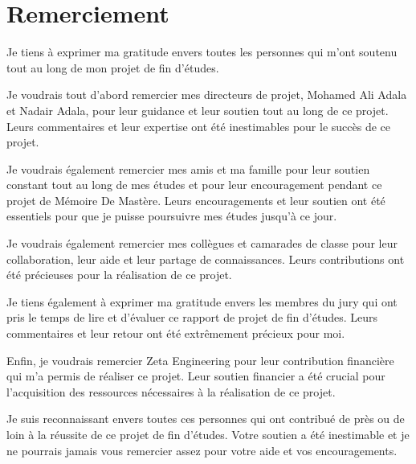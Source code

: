 \chapter*{Remerciement }

\setlength{\parskip}{5mm}
\setlength{\parindent}{1cm}


\large{
Je tiens à exprimer ma gratitude envers toutes les personnes qui m'ont soutenu tout au long de mon projet de fin d'études.


Je voudrais tout d'abord remercier mes directeurs de projet, Mohamed Ali Adala et Nadair Adala, pour leur guidance et leur soutien tout au long de ce projet. Leurs commentaires et leur expertise ont été inestimables pour le succès de ce projet.


Je voudrais également remercier mes amis et ma famille pour leur soutien constant tout au long de mes études et pour leur encouragement pendant ce projet de Mémoire De Mastère. Leurs encouragements et leur soutien ont été essentiels pour que je puisse poursuivre mes études jusqu'à ce jour.


Je voudrais également remercier mes collègues et camarades de classe pour leur collaboration, leur aide et leur partage de connaissances. Leurs contributions ont été précieuses pour la réalisation de ce projet.


Je tiens également à exprimer ma gratitude envers les membres du jury qui ont pris le temps de lire et d'évaluer ce rapport de projet de fin d'études. Leurs commentaires et leur retour ont été extrêmement précieux pour moi.


Enfin, je voudrais remercier Zeta Engineering pour leur contribution financière qui m'a permis de réaliser ce projet. Leur soutien financier a été crucial pour l'acquisition des ressources nécessaires à la réalisation de ce projet.


Je suis reconnaissant envers toutes ces personnes qui ont contribué de près ou de loin à la réussite de ce projet de fin d'études. Votre soutien a été inestimable et je ne pourrais jamais vous remercier assez pour votre aide et vos encouragements.}